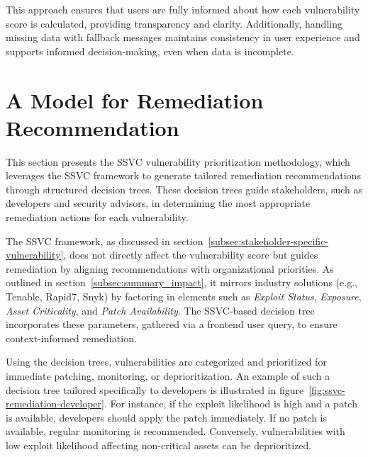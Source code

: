 This approach ensures that users are fully informed about how each vulnerability score is calculated, providing transparency and clarity. Additionally, handling missing data with fallback messages maintains consistency in user experience and supports informed decision-making, even when data is incomplete.

\section{A Model for Remediation Recommendation}
\label{sec:remediation_recommendation}

This section presents the \ac{SSVC} vulnerability prioritization methodology, which leverages the \ac{SSVC} framework to generate tailored remediation recommendations through structured decision trees. These decision trees guide stakeholders, such as developers and security advisors, in determining the most appropriate remediation actions for each vulnerability.

The \ac{SSVC} framework, as discussed in section~\ref{subsec:stakeholder-specific-vulnerability}, does not directly affect the vulnerability score but guides remediation by aligning recommendations with organizational priorities. As outlined in section~\ref{subsec:summary_impact}, it mirrors industry solutions (e.g., Tenable, Rapid7, Snyk) by factoring in elements such as \emph{Exploit Status}, \emph{Exposure}, \emph{Asset Criticality}, and \emph{Patch Availability}. The \ac{SSVC}-based decision tree incorporates these parameters, gathered via a frontend user query, to ensure context-informed remediation.

Using the decision trees, vulnerabilities are categorized and prioritized for immediate patching, monitoring, or deprioritization. An example of such a decision tree tailored specifically to developers is illustrated in figure~\ref{fig:ssvc-remediation-developer}. For instance, if the exploit likelihood is high and a patch is available, developers should apply the patch immediately. If no patch is available, regular monitoring is recommended. Conversely, vulnerabilities with low exploit likelihood affecting non-critical assets can be deprioritized.

